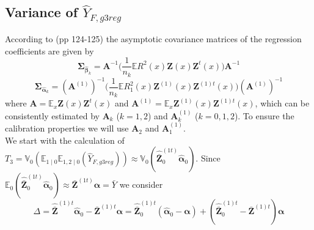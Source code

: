 \documentclass[a4paper,12pt,leqno, titlepage]{article}
\newcommand{\EX}{\mathbb{E}}
\newcommand{\VAR}{\mathbb{V}}
\begin{document}
 
\begin{appendix}
\clearpage
\newpage
\section{Variance of $\hat{Y}_{F,g3reg}$}\label{proofofvariance}
According to \cite{mandallaz} (pp 124-125) the asymptotic covariance matrices of the regression coefficients are given
by
\begin{equation}\label{lemma1}
\pmb{\Sigma}_{\hat{\pmb{\beta}}_k}=\pmb{A}^{-1}
\Big(\frac{1}{n_k}\EX R^2(x)\pmb{Z}(x)\pmb{Z}^t(x)\Big)\pmb{A}^{-1}
\end{equation}
\begin{equation}\label{lemma2}
\pmb{\Sigma}_{\hat{\pmb{\alpha}}_k}=(\pmb{A}^{(1)})^{-1}
\Big(\frac{1}{n_k}\EX R_1^2(x)\pmb{Z}^{(1)}(x)\pmb{Z}^{(1)t}(x)\Big)(\pmb{A}^{(1)})^{-1}
\end{equation}
\noindent where $\pmb{A}=\EX_x \pmb{Z}(x)\pmb{Z}^t(x)$  and $\pmb{A}^{(1)}=\EX_x \pmb{Z}^{(1)}(x)\pmb{Z}^{(1)t}(x)$, which can be consistently estimated by $\pmb{A}_k$ ($k=1,2$) and  $\pmb{A}_k^{(1)}$ ($k=0,1,2$). To ensure the calibration properties we will use $\pmb{A}_2$ and $\pmb{A}_1^{(1)}$.\\
We start with the calculation of
$T_3=\VAR_0(\EX_{1 \mid 0}\EX_{1,2 \mid 0}(\hat{Y}_{F,g3reg}))\approx \VAR_0(\hat{\bar{\pmb{Z}}}_0^{(1t)}\hat{\pmb{\alpha}}_0)$. Since
$\EX_0(\hat{\bar{\pmb{Z}}}_0^{(1t)}\hat{\pmb{\alpha}}_0) \approx \bar{\pmb{Z}}^{(1t)}\pmb{\alpha}=\bar{Y}$
we consider
\begin{equation*}
\Delta=\hat{\bar{\pmb{Z}}}^{(1)t}\hat{\pmb{\alpha}}_{0}-\bar{\pmb{Z}}^{(1)t}\pmb{\alpha}=
\hat{\bar{\pmb{Z}}}_0^{(1)t}(\hat{\pmb{\alpha}}_{0}-\pmb{\alpha})+ (\hat{\bar{\pmb{Z}}}_0^{(1)t}-\bar{\pmb{Z}}^{(1)t})\pmb{\alpha}
\end{equation*}


\end{appendix}
\end{document}
